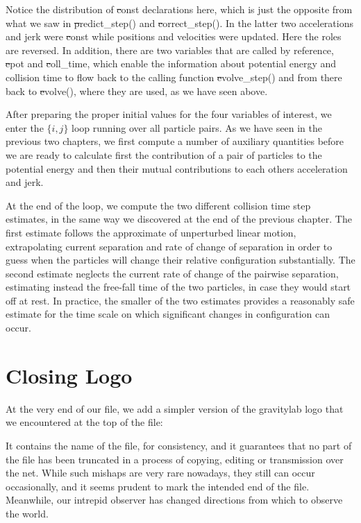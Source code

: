 Notice the distribution of {\st const} declarations here, which is
just the opposite from what we saw in {\st predict\_step()} and 
{\st correct\_step()}.  In the latter two accelerations and jerk were 
{\st const} while positions and velocities were updated.  Here the
roles are reversed.  In addition, there are two variables that are
called by reference, {\st epot} and {\st coll\_time}, which enable the
information about potential energy and collision time to flow back to
the calling function {\st evolve\_step()} and from there back to
{\st evolve()}, where they are used, as we have seen above.

After preparing the proper initial values for the four variables of
interest, we enter the $\{i,j\}$ loop running over all particle pairs.
As we have seen in the previous two chapters, we first compute a
number of auxiliary quantities before we are ready to calculate first
the contribution of a pair of particles to the potential energy and
then their mutual contributions to each others acceleration and jerk.

At the end of the loop, we compute the two different collision time
step estimates, in the same way we discovered at the end of the
previous chapter.  The first estimate follows the approximate of
unperturbed linear motion, extrapolating current separation and rate
of change of separation in order to guess when the particles will
change their relative configuration substantially.  The second estimate
neglects the current rate of change of the pairwise separation,
estimating instead the free-fall time of the two particles, in case
they would start off at rest.  In practice, the smaller of the two
estimates provides a reasonably safe estimate for the time scale on
which significant changes in configuration can occur.

\section{Closing Logo}

At the very end of our file, we add a simpler version of the
gravitylab logo that we encountered at the top of the file:


It contains the name of the file, for consistency, and it guarantees
that no part of the file has been truncated in a process of copying,
editing or transmission over the net.  While such mishaps are very
rare nowadays, they still can occur occasionally, and it seems prudent
to mark the intended end of the file.  Meanwhile, our intrepid observer
has changed directions from which to observe the world.
